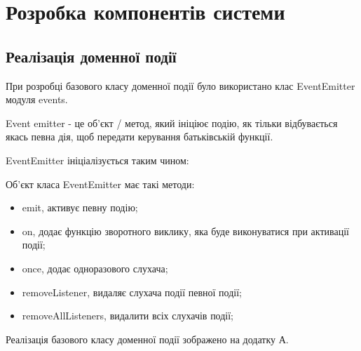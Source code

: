 \section{Розробка компонентів системи}

\subsection{Реалізація доменної події}

При розробці базового класу доменної події було використано клас EventEmitter модуля events.

Event emitter - це об'єкт / метод, який ініціює подію, як тільки відбувається якась певна дія,
щоб передати керування батьківській функції.

EventEmitter ініціалізується таким чином:


Об'єкт класа EventEmitter має такі методи:

\begin{itemize}
    \item emit, активує певну подію;
    \item on, додає функцію зворотного виклику,
        яка буде виконуватися при активації події;
    \item once, додає одноразового слухача;
    \item removeListener, видаляє слухача події певної події;
    \item removeAllListeners, видалити всіх слухачів події;
\end{itemize}

Реалізація базового класу доменної події зображено на додатку А.
